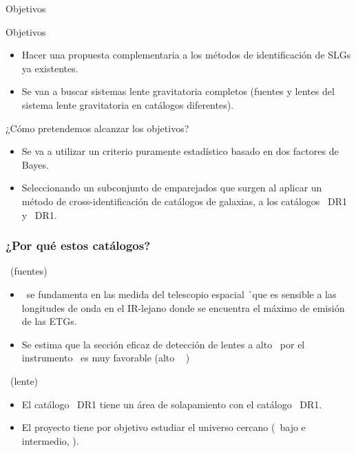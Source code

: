 \documentclass[8pt]{beamer}
\begin{document}
\begin{frame}{Objetivos}

Objetivos

\begin{itemize}

\item Hacer una propuesta complementaria a los métodos de identificación de SLGs ya existentes.

\item Se van a buscar sistemas lente gravitatoria completos (fuentes y lentes del sistema lente gravitatoria en catálogos diferentes).

\end{itemize}

¿Cómo pretendemos alcanzar los objetivos?  
 
\begin{itemize}

\item Se va a utilizar un criterio puramente estadístico basado en dos factores de Bayes.

\item Seleccionando un subconjunto de emparejados que surgen al aplicar un método de cross-identificación de catálogos de galaxias, a los catálogos \hatlas\ DR1 y \gama\ DR1.

\end{itemize}
    
\end{frame}


\begin{frame}
\frametitle{¿Por qué estos catálogos?}

\hatlas\ (fuentes)

\begin{itemize}
    \item \hatlas\ se fundamenta en las medida del telescopio espacial \h\ que es sensible a las longitudes de onda en el IR-lejano donde se encuentra el máximo de emisión de las ETGs.
    
    \item Se estima que la sección eficaz de detección de lentes a alto \rt\ por el instrumento \spire\ es muy favorable (alto \rt\ \maths{\implies} )
    
\end{itemize}

\vspace{.5cm}

\gama\ (lente)

\begin{itemize}
    \item El catálogo \gama\ DR1 tiene un área de solapamiento con el catálogo \hatlas\ DR1.
    
    \item El proyecto tiene por objetivo estudiar el universo cercano (\rt\ bajo e intermedio, ).
    
\end{itemize}

\end{frame}
\end{document}
